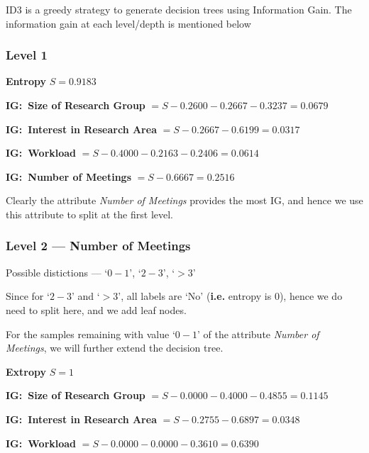 \documentclass[a4paper,11pt]{article}
\begin{document}
\begin{mlsolution}
\begin{addmargin}{1.5em}
        ID3 is a greedy strategy to generate decision trees using Information Gain. The information gain at each level/depth is mentioned below

        \subsubsection{Level 1}
        \begin{addmargin}{1.5em}

            \textbf{Entropy} $S = 0.9183$ \br%

            \textbf{IG:\ Size of Research Group} $ = S - 0.2600 - 0.2667 - 0.3237 = 0.0679$

            \textbf{IG:\ Interest in Research Area} $ = S - 0.2667 - 0.6199 = 0.0317$

            \textbf{IG:\ Workload} $ = S - 0.4000 - 0.2163 - 0.2406 = 0.0614$

            \textbf{IG:\ Number of Meetings} $ = S - 0.6667 = 0.2516$ \br%

            Clearly the attribute \textit{Number of Meetings} provides the most IG, and hence we use this attribute to split at the first level.

        \end{addmargin}

        \subsubsection{Level 2 --- Number of Meetings}
        \begin{addmargin}{1.5em}

            Possible distictions --- `$0 - 1$', `$2 - 3$', `$> 3$' \br%

            Since for `$2 - 3$' and `$> 3$', all labels are `No' (\textbf{i.e.} entropy is $0$), hence we do need to split here, and we add leaf nodes. \br%

            For the samples remaining with value `$0 - 1$' of the attribute \textit{Number of Meetings}, we will further extend the decision tree. \br%

            \textbf{Extropy} $S = 1$ \br%

            \textbf{IG:\ Size of Research Group} $ = S - 0.0000 - 0.4000 - 0.4855 = 0.1145$

            \textbf{IG:\ Interest in Research Area} $ = S - 0.2755 - 0.6897 = 0.0348$

            \textbf{IG:\ Workload} $ = S - 0.0000 - 0.0000 - 0.3610 = 0.6390$
            \br%


\end{addmargin}
\end{addmargin}
\end{mlsolution}
\end{document}
